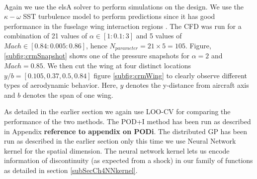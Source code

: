 Again we use the elsA\textsuperscript{\textregistered} solver to perform simulations on the design. We use the \(\kappa - \omega\) SST turbulence model to perform predictions since it has good performance in the fuselage wing interaction regions \cite{menter2003ten, vassberg2014summary}. The CFD was run for a combination of 21 values of \(\alpha \in [1: 0.1: 3]\) and 5 values of \(Mach \in [0.84: 0.005: 0.86]\), hence \(N_{parameter} = 21\times5 = 105\). Figure, \ref{subfig:crmSnapshot} shows one of the pressure snapshots for \(\alpha = 2\) and \(Mach = 0.85\). We then cut the wing at four distinct locations \(y/b = [0.105, 0.37, 0.5, 0.84]\) figure \ref{subfig:crmWing} to clearly observe different types of aerodynamic behavior. Here, \(y\) denotes the y-distance from aircraft axis and \(b\) denotes the span of one wing. 

As detailed in the earlier section we again use LOO-CV for comparing the performance of the two methods. The POD+I method has been run as described in Appendix \textbf{reference to appendix on PODi}. The distributed GP has been run as described in the earlier section only this time we use Neural Network kernel for the spatial dimension. The neural network kernel lets us encode information of discontinuity (as expected from a shock) in our family of functions as detailed in section \ref{subSecCh4NNkernel}. 

